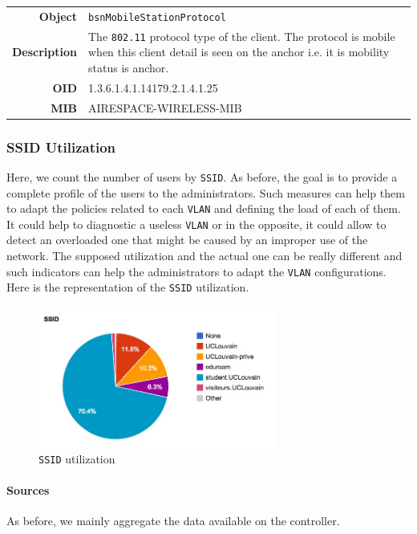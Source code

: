 \noindent
\begin{tabular}{|r l|}
\hline 
\textbf{Object} & \texttt{bsnMobileStationProtocol} \\
\textbf{Description} & \parbox{11cm}{The \texttt{802.11} protocol type of the client. The protocol is mobile when this client detail is seen on the anchor i.e. it is mobility status is anchor.} \\
\textbf{OID} & 1.3.6.1.4.1.14179.2.1.4.1.25 \\
\textbf{MIB} & AIRESPACE-WIRELESS-MIB \\
\hline
\end{tabular}

\subsubsection*{SSID Utilization}
Here, we count the number of users by \texttt{SSID}. As before, the goal is to provide a complete profile of the users to the administrators. Such measures can help them to adapt the policies related to each \texttt{VLAN} and defining the load of each of them. It could help to diagnostic a useless \texttt{VLAN} or in the opposite, it could allow to detect an overloaded one that might be caused by an improper use of the network. The supposed utilization and the actual one can be really different and such indicators can help the administrators to adapt the \texttt{VLAN} configurations. Here is the representation of the \texttt{SSID} utilization.
\begin{figure}[H]
	\centering
   \includegraphics[width=0.7\textwidth]{Pictures/chapter5/ssid-utilization.jpg}
   \caption{\texttt{SSID} utilization}
\end{figure} 

\paragraph*{Sources} As before, we mainly aggregate the data available on the controller.


